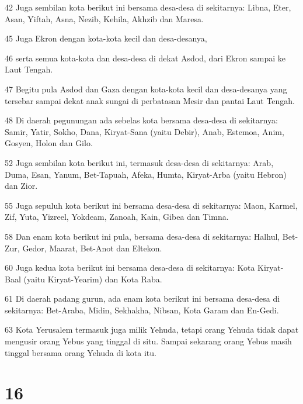 \par 42 Juga sembilan kota berikut ini bersama desa-desa di sekitarnya: Libna, Eter, Asan, Yiftah, Asna, Nezib, Kehila, Akhzib dan Maresa.
\par 45 Juga Ekron dengan kota-kota kecil dan desa-desanya,
\par 46 serta semua kota-kota dan desa-desa di dekat Asdod, dari Ekron sampai ke Laut Tengah.
\par 47 Begitu pula Asdod dan Gaza dengan kota-kota kecil dan desa-desanya yang tersebar sampai dekat anak sungai di perbatasan Mesir dan pantai Laut Tengah.
\par 48 Di daerah pegunungan ada sebelas kota bersama desa-desa di sekitarnya: Samir, Yatir, Sokho, Dana, Kiryat-Sana (yaitu Debir), Anab, Estemoa, Anim, Gosyen, Holon dan Gilo.
\par 52 Juga sembilan kota berikut ini, termasuk desa-desa di sekitarnya: Arab, Duma, Esan, Yanum, Bet-Tapuah, Afeka, Humta, Kiryat-Arba (yaitu Hebron) dan Zior.
\par 55 Juga sepuluh kota berikut ini bersama desa-desa di sekitarnya: Maon, Karmel, Zif, Yuta, Yizreel, Yokdeam, Zanoah, Kain, Gibea dan Timna.
\par 58 Dan enam kota berikut ini pula, bersama desa-desa di sekitarnya: Halhul, Bet-Zur, Gedor, Maarat, Bet-Anot dan Eltekon.
\par 60 Juga kedua kota berikut ini bersama desa-desa di sekitarnya: Kota Kiryat-Baal (yaitu Kiryat-Yearim) dan Kota Raba.
\par 61 Di daerah padang gurun, ada enam kota berikut ini bersama desa-desa di sekitarnya: Bet-Araba, Midin, Sekhakha, Nibsan, Kota Garam dan En-Gedi.
\par 63 Kota Yerusalem termasuk juga milik Yehuda, tetapi orang Yehuda tidak dapat mengusir orang Yebus yang tinggal di situ. Sampai sekarang orang Yebus masih tinggal bersama orang Yehuda di kota itu.

\chapter{16}

